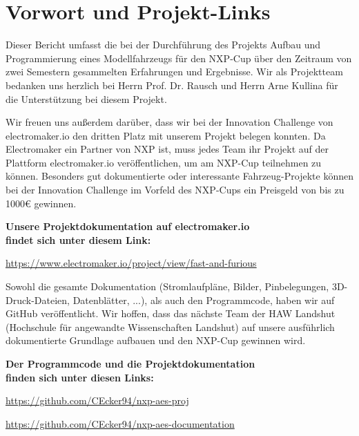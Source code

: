 

\pagestyle{fancy}
\rhead{\thepage} \chead{} 
\cfoot{}


\section*{Vorwort und Projekt-Links}\label{Sec0}

Dieser Bericht umfasst die bei der Durchführung des Projekts \glqq{}Aufbau und Programmierung eines Modellfahrzeugs für den  \ac{NXP}-Cup\grqq{} über den Zeitraum von zwei Semestern gesammelten Erfahrungen und Ergebnisse. Wir als Projektteam bedanken uns herzlich bei Herrn Prof. Dr. Rausch und Herrn Arne Kullina für die Unterstützung bei diesem Projekt.\vspace{11pt} 

Wir freuen uns außerdem darüber, dass wir bei der Innovation Challenge von electromaker.io den dritten Platz mit unserem Projekt belegen konnten. Da Electromaker ein Partner von NXP ist, muss jedes Team ihr Projekt auf der Plattform electromaker.io veröffentlichen, um am \ac{NXP}-Cup teilnehmen zu können. Besonders gut dokumentierte oder interessante Fahrzeug-Projekte können bei der Innovation Challenge im Vorfeld des \ac{NXP}-Cups ein Preisgeld von bis zu 1000€ gewinnen.\vspace{11pt}

\begin{center}
\textbf{Unsere Projektdokumentation auf electromaker.io}\\
\textbf{findet sich unter diesem Link:}\vspace{9pt} 

\url{https://www.electromaker.io/project/view/fast-and-furious}

\end{center}

Sowohl die gesamte Dokumentation (Stromlaufpläne, Bilder, Pinbelegungen, 3D-Druck-Dateien, Datenblätter, ...), als auch den Programmcode, haben wir auf GitHub veröffentlicht. Wir hoffen, dass das nächste Team der HAW Landshut (Hochschule für angewandte Wissenschaften Landshut) auf unsere ausführlich dokumentierte Grundlage aufbauen und den NXP-Cup gewinnen wird.\vspace{11pt} 

\begin{center}
\textbf{Der Programmcode und die Projektdokumentation}\\
\textbf{finden sich unter diesen Links:}\vspace{9pt} 

\url{https://github.com/CEcker94/nxp-aes-proj}\vspace{5pt} 

\url{https://github.com/CEcker94/nxp-aes-documentation}

\end{center}


\newpage